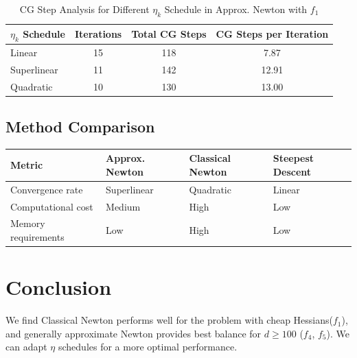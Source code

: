 \documentclass[12pt]{article}
\begin{document}

\begin{table}[h]
    \centering
    \begin{tabular}{lccc}
        \toprule
        \textbf{$\eta_k$ Schedule} & \textbf{Iterations} & \textbf{Total CG Steps} & \textbf{CG Steps per Iteration} \\
        \midrule
        Linear & 15 & 118 & 7.87 \\
        Superlinear & 11 & 142 & 12.91 \\
        Quadratic & 10 & 130 & 13.00 \\
        \bottomrule
    \end{tabular}
    \caption{CG Step Analysis for Different $\eta_k$ Schedule in Approx. Newton with $f_1$}
    \label{tab:cg_steps}
\end{table}

\subsection{Method Comparison}
\begin{tabular}{llll}
    \toprule
    Metric & Approx. Newton & Classical Newton & Steepest Descent \\
    \midrule
    Convergence rate & Superlinear & Quadratic & Linear \\
    Computational cost & Medium & High & Low \\
    Memory requirements & Low & High & Low \\
    \bottomrule
\end{tabular}


\section{Conclusion}

We find Classical Newton performs well for the problem with cheap Hessians($f_1$), and generally approximate Newton provides best balance for $d \geq 100$ ($f_4$, $f_5$). We can adapt $\eta$ schedules for a more optimal performance.
\end{document}
